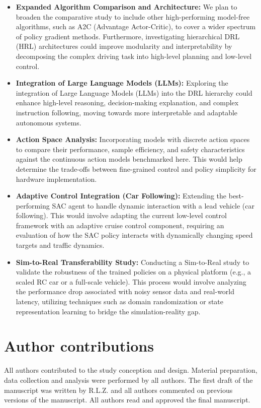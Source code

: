 \documentclass[]{interact}
\begin{document}
\begin{itemize}
    \item \textbf{Expanded Algorithm Comparison and Architecture:} We plan to broaden the comparative study to include other high-performing model-free algorithms, such as A2C (Advantage Actor-Critic), to cover a wider spectrum of policy gradient methods. Furthermore, investigating hierarchical DRL (HRL) architectures could improve modularity and interpretability by decomposing the complex driving task into high-level planning and low-level control.
    \item \textbf{Integration of Large Language Models (LLMs):} Exploring the integration of Large Language Models (LLMs) into the DRL hierarchy could enhance high-level reasoning, decision-making explanation, and complex instruction following, moving towards more interpretable and adaptable autonomous systems.
    \item \textbf{Action Space Analysis:} Incorporating models with discrete action spaces to compare their performance, sample efficiency, and safety characteristics against the continuous action models benchmarked here. This would help determine the trade-offs between fine-grained control and policy simplicity for hardware implementation.
    \item \textbf{Adaptive Control Integration (Car Following):} Extending the best-performing SAC agent to handle dynamic interaction with a lead vehicle (car following). This would involve adapting the current low-level control framework with an adaptive cruise control component, requiring an evaluation of how the SAC policy interacts with dynamically changing speed targets and traffic dynamics.
    \item \textbf{Sim-to-Real Transferability Study:} Conducting a Sim-to-Real study to validate the robustness of the trained policies on a physical platform (e.g., a scaled RC car or a full-scale vehicle). This process would involve analyzing the performance drop associated with noisy sensor data and real-world latency, utilizing techniques such as domain randomization or state representation learning to bridge the simulation-reality gap.
\end{itemize}

\section*{Author contributions}

All authors contributed to the study conception and design. Material preparation, data collection and analysis were performed by all authors. The first draft of the manuscript was written by R.L.Z. and all authors commented on previous versions of the manuscript. All authors read and approved the final manuscript.
\end{document}
